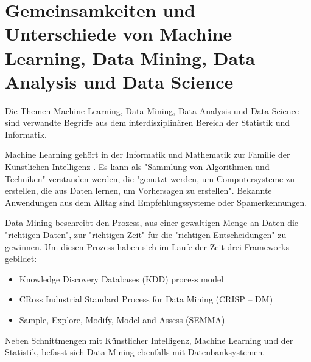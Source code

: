 \section{Gemeinsamkeiten und Unterschiede von Machine Learning, Data Mining, Data Analysis und Data Science}\label{sec:DataMining}
Die Themen Machine Learning, Data Mining, Data Analysis und Data Science sind verwandte Begriffe aus dem interdisziplinären Bereich der Statistik und Informatik.  \par
Machine Learning gehört in der Informatik und Mathematik zur Familie der Künstlichen Intelligenz . Es kann als "Sammlung von Algorithmen und Techniken" verstanden werden, die "genutzt werden, um Computersysteme zu erstellen, die aus Daten lernen, um Vorhersagen zu erstellen"\citep[S.~53; eigene Übersetzung]{swamynathan_mastering_2017}. Bekannte Anwendungen aus dem Alltag sind Empfehlungssysteme oder Spamerkennungen\citep[S.~53]{swamynathan_mastering_2017}.\par
Data Mining beschreibt den Prozess, aus einer gewaltigen Menge an Daten die "richtigen Daten", zur "richtigen Zeit" für die "richtigen Entscheidungen"\citep[S.~61; eigene Übersetzung]{swamynathan_mastering_2017} zu gewinnen. Um diesen Prozess haben sich im Laufe der Zeit drei Frameworks gebildet\citep[S.~69]{swamynathan_mastering_2017}:
\begin{itemize}
\item Knowledge Discovery Databases (KDD) process model
\item CRoss Industrial Standard Process for Data Mining (CRISP – DM)
\item Sample, Explore, Modify, Model and Assess (SEMMA)
\end{itemize}
Neben Schnittmengen mit Künstlicher Intelligenz, Machine Learning und der Statistik, befasst sich Data Mining ebenfalls mit Datenbanksystemen\citep[S.~4]{ramasubramanian_machine_2017}.

